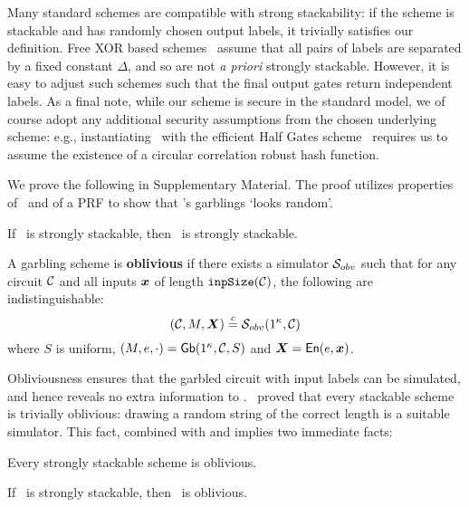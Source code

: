 Many standard schemes are compatible with strong stackability:
if the scheme is stackable and has randomly chosen output labels, it
trivially satisfies our definition.
%
Free XOR based schemes~\cite{ICALP:KolSch08} assume that all
pairs of labels are separated by a fixed constant $\Delta$, and so
are not \emph{a priori} strongly stackable. However, it is easy to adjust such
schemes such that the final output gates return independent labels.
%
As a final note, while our scheme is secure in the standard model, we
of course adopt any additional security assumptions from the chosen
underlying scheme: e.g., instantiating \ourschemelong\ with the efficient
Half Gates scheme~\cite{EC:ZahRosEva15} requires us to assume the
existence of a circular correlation robust hash function.

We prove the following in Supplementary Material. The proof
utilizes properties of \underscheme\ and of a PRF to show
that \ourschemelong's garblings `looks random'.

\begin{theorem}\label{thm:strongstack}
  If \underscheme\ is strongly stackable, then \ourschemelong\ is strongly stackable.
\end{theorem}
\begin{definition}[Obliviousness]\label{def:obliviousness}
  A garbling scheme is \textbf{oblivious} if there exists a
  simulator $\mathcal{S}_{obv}$ such that for
  any circuit $\mathcal C$
  and all inputs $\cirinp$ of length $\mathtt{inpSize}(\mathcal C)$,
  the following are indistinguishable:
  \[
    (\cir, \mat, \gcirinp) \indist \simulator_{obv}(1^\kappa, \cir)
  \]
  where
   $S$ is uniform,
   $(M, e, \cdot) = \textsf{Gb}(1^\kappa,\mathcal C,S)$
  and $\gcirinp = \gEn(e,\cirinp)$.
\end{definition}

Obliviousness ensures that the garbled circuit with input labels can be simulated, and
hence reveals no extra information to \E.
\HK\ proved that every stackable scheme is trivially oblivious:
drawing a random string of the correct length is a suitable simulator.
This fact, combined with  and
 implies two
immediate facts:
\begin{lemma}\label{lemma:obliviousness}
  Every strongly stackable scheme is oblivious.
\end{lemma}
\begin{theorem}\label{thm:oblivious}
  If \underscheme\ is strongly stackable, then \ourschemelong\ is oblivious.
\end{theorem}

